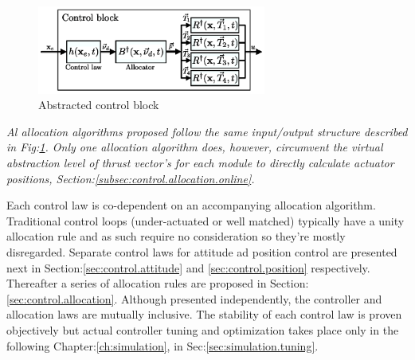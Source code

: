 \begin{figure}[htbp]
\centering
\includegraphics[width=0.67\textwidth]{figs/control-block}
\caption{Abstracted control block}
\label{fig:control-block}
\end{figure}
\par
\vspace{-10pt}
\emph{\color{Gray} Al allocation algorithms proposed follow the same input/output structure described in Fig:\ref{fig:control-block}. Only one allocation algorithm does, however, circumvent the virtual abstraction level of thrust vector's for each module to directly calculate actuator positions, Section:\ref{subsec:control.allocation.online}.}
\par
Each control law is co-dependent on an accompanying allocation algorithm. Traditional control loops (under-actuated or well matched) typically have a unity allocation rule and as such require no consideration so they're mostly disregarded. Separate control laws for attitude ad position control are presented next in Section:\ref{sec:control.attitude} and \ref{sec:control.position} respectively. Thereafter a series of allocation rules are proposed in Section:\ref{sec:control.allocation}. Although presented independently, the controller and allocation laws are mutually inclusive. The stability of each control law is proven objectively but actual controller tuning and optimization takes place only in the following Chapter:\ref{ch:simulation}, in Sec:\ref{sec:simulation.tuning}.
\par
